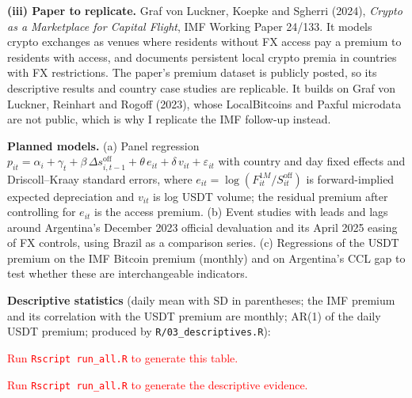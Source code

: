 \documentclass[11pt]{article}
\newif\ifedamacros
\begin{document}
\textbf{(iii) Paper to replicate.} Graf von Luckner, Koepke and Sgherri (2024), \emph{Crypto as a Marketplace for Capital Flight}, IMF Working Paper 24/133. It models crypto exchanges as venues where residents without FX access pay a premium to residents with access, and documents persistent local crypto premia in countries with FX restrictions. The paper's premium dataset is publicly posted, so its descriptive results and country case studies are replicable. It builds on Graf von Luckner, Reinhart and Rogoff (2023), whose LocalBitcoins and Paxful microdata are not public, which is why I replicate the IMF follow-up instead.

\textbf{Planned models.} (a) Panel regression $p_{it}=\alpha_i+\gamma_t+\beta\,\Delta s^{\text{off}}_{i,t-1}+\theta\,e_{it}+\delta\,v_{it}+\varepsilon_{it}$ with country and day fixed effects and Driscoll--Kraay standard errors, where $e_{it}=\log(F^{1M}_{it}/S^{\text{off}}_{it})$ is forward-implied expected depreciation and $v_{it}$ is log USDT volume; the residual premium after controlling for $e_{it}$ is the access premium. (b) Event studies with leads and lags around Argentina's December 2023 official devaluation and its April 2025 easing of FX controls, using Brazil as a comparison series. (c) Regressions of the USDT premium on the IMF Bitcoin premium (monthly) and on Argentina's CCL gap to test whether these are interchangeable indicators.

\textbf{Descriptive statistics} (daily mean with SD in parentheses; the IMF premium and its correlation with the USDT premium are monthly; AR(1) of the daily USDT premium; produced by \texttt{R/03\_descriptives.R}):\\[2pt]
\begin{center}\small
{}
  {}
  {\textcolor{red}{Run \texttt{Rscript run\_all.R} to generate this table.}}
\end{center}

\ifedamacros
\textbf{Descriptive evidence.} The panel has \Ncountrydays{} country-days. Argentina's premium is highly persistent (AR(1) \ARGarone, half-life \ARGhalflife{} days, ADF $p=\ARGadfp$), as is Ukraine's (\UKRarone), while Turkey's (\TURarone) and Brazil's (\BRAarone) revert within days. In the \Eventwindow{} days around the December 2023 devaluation, Argentina's mean premium fell from \ARGdecpre{} to \ARGdecpost{} (CCL gap \ARGdecparpre{} to \ARGdecparpost), and around the April 2025 easing from \ARGaprpre{} to \ARGaprpost. The USDT premium moves almost one for one with the CCL gap (daily correlation \ARGcorrpar) and with the IMF Bitcoin premium (monthly correlation \ARGcorrbtc{} over \ARGnbtc{} months; \UKRcorrbtc{} for Ukraine), but not in Brazil (\BRAcorrbtc), where both premia are near zero.
\else
\textcolor{red}{Run \texttt{Rscript run\_all.R} to generate the descriptive evidence.}
\fi
\end{document}
